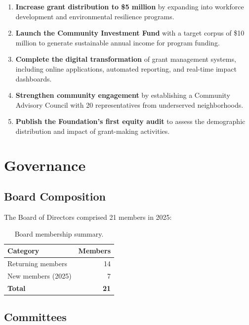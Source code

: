 \documentclass[
    language=english,
    doctype=article,
    institution=none,
]{../../omnilatex}
\begin{document}
\begin{enumerate}
    \item \textbf{Increase grant distribution to \$5 million} by expanding
        into workforce development and environmental resilience programs.
    \item \textbf{Launch the Community Investment Fund} with a target
        corpus of \$10 million to generate sustainable annual income for
        program funding.
    \item \textbf{Complete the digital transformation} of grant
        management systems, including online applications, automated
        reporting, and real-time impact dashboards.
    \item \textbf{Strengthen community engagement} by establishing a
        Community Advisory Council with 20 representatives from
        underserved neighborhoods.
    \item \textbf{Publish the Foundation's first equity audit} to assess
        the demographic distribution and impact of grant-making activities.
\end{enumerate}

\section{Governance}

\subsection{Board Composition}

The Board of Directors comprised 21 members in 2025:

\begin{table}[h]
    \centering
    \begin{tabular}{lr}
        \toprule
        \textbf{Category} & \textbf{Members} \\
        \midrule
        Returning members  & 14 \\
        New members (2025) &  7 \\
        \midrule
        \textbf{Total}     & \textbf{21} \\
        \bottomrule
    \end{tabular}
    \caption{Board membership summary.}
\end{table}

\subsection{Committees}
\end{document}
